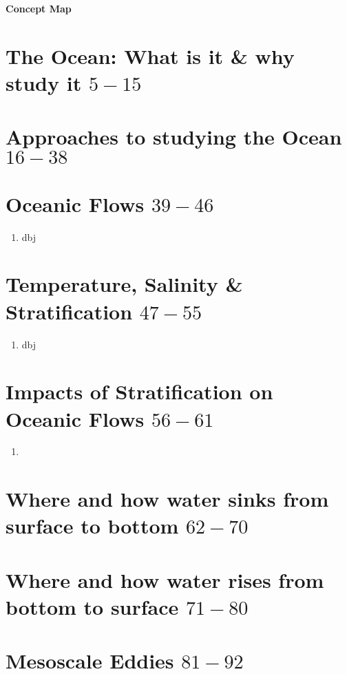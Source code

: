 \documentclass[11pt]{article}
\begin{document}
\begin{center}
\vspace{0.6cm}
{\Large \bf Concept Map}
\vspace{0.3cm}
\end{center}

\section{The Ocean: What is it \& why study it $5-15$} 

\section{Approaches to studying the Ocean $16-38$} 

\section{Oceanic Flows $39-46$}

\begin{enumerate}
    \item dbj
\end{enumerate}


\section{Temperature, Salinity \& Stratification $47-55$}

\begin{enumerate}
    \item dbj
\end{enumerate}

\section{Impacts of Stratification on Oceanic Flows $56-61$}

\begin{enumerate}
    \item 
\end{enumerate}

\section{Where and how water sinks from surface to bottom $62-70$}

\section{Where and how water rises from bottom to surface $71-80$}

\section{Mesoscale Eddies $81-92$}
\end{document}
